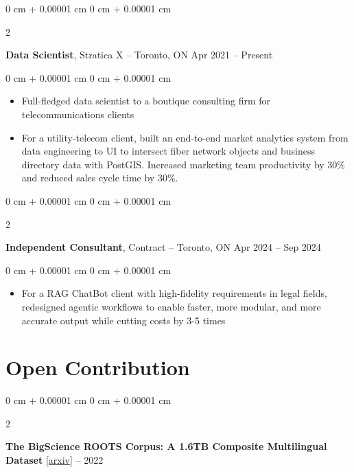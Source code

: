 \documentclass[10pt, letterpaper]{article}
\newenvironment{highlights}{
    \begin{itemize}[
        topsep=0.10 cm,
        parsep=0.10 cm,
        partopsep=0pt,
        itemsep=0pt,
        leftmargin=0 cm + 10pt
    ]
}{
    \end{itemize}
} %
\newenvironment{onecolentry}{
    \begin{adjustwidth}{
        0 cm + 0.00001 cm
    }{
        0 cm + 0.00001 cm
    }
}{
    \end{adjustwidth}
} %
\newenvironment{twocolentry}[2][]{
    \onecolentry
    \def\secondColumn{#2}
    \setcolumnwidth{\fill, 4.5 cm}
    \begin{paracol}{2}
}{
    \switchcolumn \raggedleft \secondColumn
    \end{paracol}
    \endonecolentry
} %
\begin{document}
    \begin{twocolentry}{
        Apr 2021 – Present
    }
        \textbf{Data Scientist}, Stratica X -- Toronto, ON\end{twocolentry}

    \vspace{0.10 cm}
    \begin{onecolentry}
        \begin{highlights}
            \item Full-fledged data scientist to a boutique consulting firm for telecommunications clients

            \item For a utility-telecom client, built an end-to-end market analytics system from data engineering to UI to intersect fiber network objects and business directory data with PostGIS. Increased marketing team productivity by 30\% and reduced sales cycle time by 30\%.
        \end{highlights}
    \end{onecolentry}    

    \vspace{0.2 cm}

    \begin{twocolentry}{
        Apr 2024 – Sep 2024
    }
        \textbf{Independent Consultant}, Contract -- Toronto, ON\end{twocolentry}

    \vspace{0.10 cm}
    \begin{onecolentry}
        \begin{highlights}
            \item For a RAG ChatBot client with high-fidelity requirements in legal fields, redesigned agentic workflows to enable faster, more modular, and more accurate output while cutting costs by 3-5 times
        \end{highlights}
    \end{onecolentry}

    \section{Open Contribution}

    \begin{twocolentry}{
        2021 – 2022
    }
        \textbf{The BigScience ROOTS Corpus: A 1.6TB Composite Multilingual Dataset} \href{https://arxiv.org/abs/2303.03915}{[arxiv]}\end{twocolentry}
\end{document}
